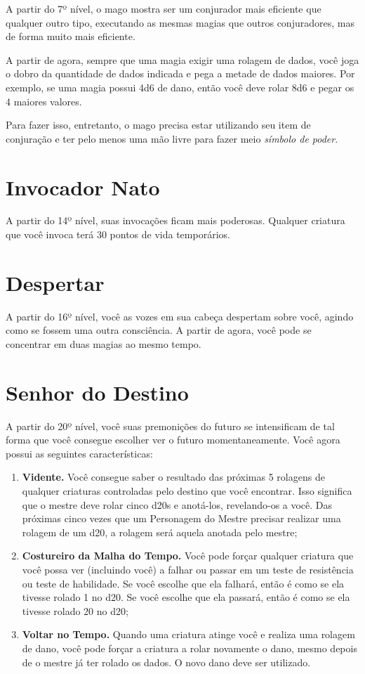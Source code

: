 \begin{multicols}{2}
A partir do 7º nível, o mago mostra ser um conjurador mais eficiente que
qualquer outro tipo, executando as mesmas magias que outros conjuradores, mas de
forma muito mais eficiente.

A partir de agora, sempre que uma magia exigir uma rolagem de dados, você joga o
dobro da quantidade de dados indicada e pega a metade de dados maiores. Por
exemplo, se uma magia possui 4d6 de dano, então você deve rolar 8d6 e pegar os
4 maiores valores.

Para fazer isso, entretanto, o mago precisa estar utilizando seu item de
conjuração e ter pelo menos uma mão livre para fazer meio \textit{símbolo de
poder}.

\section*{Invocador Nato}%

A partir do 14º nível, suas invocações ficam mais poderosas. Qualquer criatura
que você invoca terá 30 pontos de vida temporários.

\section*{Despertar}%

A partir do 16º nível, você as vozes em sua cabeça despertam sobre você, agindo
como se fossem uma outra consciência. A partir de agora, você pode se concentrar
em duas magias ao mesmo tempo.

\section*{Senhor do Destino}%

A partir do 20º nível, você suas premonições do futuro se intensificam de tal
forma que você consegue escolher ver o futuro momentaneamente. Você agora possui
as seguintes características:
\begin{enumerate}
    \item \textbf{Vidente.} Você consegue saber o resultado das próximas 5
        rolagens de qualquer criaturas controladas pelo destino que você
        encontrar. Isso significa que o mestre deve rolar cinco d20s e
        anotá-los, revelando-os a você. Das próximas cinco vezes que um
        Personagem do Mestre precisar realizar uma rolagem de um d20, a rolagem
        será aquela anotada pelo mestre;
    \item \textbf{Costureiro da Malha do Tempo.} Você pode forçar qualquer
        criatura que você possa ver (incluindo você) a falhar ou passar em um
        teste de resistência ou teste de habilidade. Se você escolhe que ela
        falhará, então é como se ela tivesse rolado 1 no d20. Se você escolhe
        que ela passará, então é como se ela tivesse rolado 20 no d20;
    \item \textbf{Voltar no Tempo.} Quando uma criatura atinge você e realiza
        uma rolagem de dano, você pode forçar a criatura a rolar novamente o
        dano, mesmo depois de o mestre já ter rolado os dados. O novo dano deve
        ser utilizado.
\end{enumerate}


\end{multicols}
